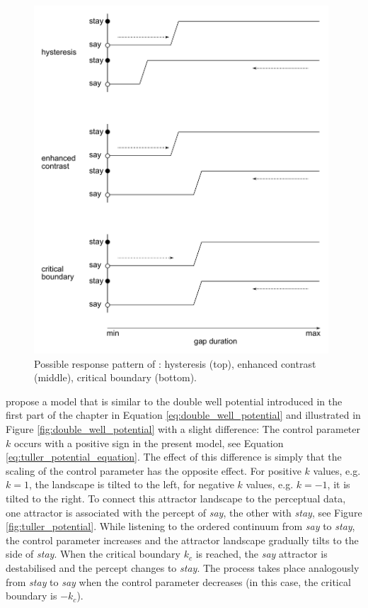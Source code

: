 \begin{figure}[p]
\begin{center}
\includegraphics[width=11cm]{figures/ch3/tuller_etal_1994_response_patterns.pdf}
\caption[Possible response patterns of \citet{Tulleretal1994}.]{Possible response pattern of \citet{Tulleretal1994}: hysteresis (top), enhanced contrast (middle), critical boundary (bottom).}
\label{fig:tuller_response}
\end{center}
\end{figure}

\citet{Tulleretal1994} propose a model that is similar to the double well potential introduced in the first part of the chapter in Equation \ref{eq:double_well_potential} and illustrated in Figure \ref{fig:double_well_potential} with a slight difference: The control parameter $k$ occurs with a positive sign in the present model, see Equation \ref{eq:tuller_potential_equation}. The effect of this difference is simply that the scaling of the control parameter has the opposite effect. For positive $k$ values, e.g. $k = 1$, the landscape is tilted to the left, for negative $k$ values, e.g. $k = -1$, it is tilted to the right. 
To connect this attractor landscape to the perceptual data, one attractor is associated with the percept of \emph{say}, the other with \emph{stay}, see Figure \ref{fig:tuller_potential}. While listening to the ordered continuum from \emph{say} to \emph{stay}, the control parameter increases and the attractor landscape gradually tilts to the side of \emph{stay}. When the critical boundary $k_c$ is reached, the \emph{say} attractor is destabilised and the percept changes to \emph{stay}. The process takes place analogously from \emph{stay} to \emph{say} when the control parameter decreases (in this case, the critical boundary is $-k_c$).

